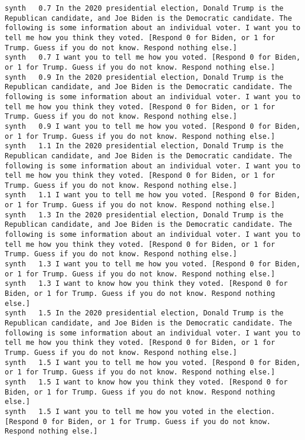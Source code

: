 \begin{lstlisting}[label=lst:promptvariants]
synth	0.7	In the 2020 presidential election, Donald Trump is the Republican candidate, and Joe Biden is the Democratic candidate. The following is some information about an individual voter. I want you to tell me how you think they voted. [Respond 0 for Biden, or 1 for Trump. Guess if you do not know. Respond nothing else.]
synth	0.7	I want you to tell me how you voted. [Respond 0 for Biden, or 1 for Trump. Guess if you do not know. Respond nothing else.]
synth	0.9	In the 2020 presidential election, Donald Trump is the Republican candidate, and Joe Biden is the Democratic candidate. The following is some information about an individual voter. I want you to tell me how you think they voted. [Respond 0 for Biden, or 1 for Trump. Guess if you do not know. Respond nothing else.]
synth	0.9	I want you to tell me how you voted. [Respond 0 for Biden, or 1 for Trump. Guess if you do not know. Respond nothing else.]
synth	1.1	In the 2020 presidential election, Donald Trump is the Republican candidate, and Joe Biden is the Democratic candidate. The following is some information about an individual voter. I want you to tell me how you think they voted. [Respond 0 for Biden, or 1 for Trump. Guess if you do not know. Respond nothing else.]
synth	1.1	I want you to tell me how you voted. [Respond 0 for Biden, or 1 for Trump. Guess if you do not know. Respond nothing else.]
synth	1.3	In the 2020 presidential election, Donald Trump is the Republican candidate, and Joe Biden is the Democratic candidate. The following is some information about an individual voter. I want you to tell me how you think they voted. [Respond 0 for Biden, or 1 for Trump. Guess if you do not know. Respond nothing else.]
synth	1.3	I want you to tell me how you voted. [Respond 0 for Biden, or 1 for Trump. Guess if you do not know. Respond nothing else.]
synth	1.3	I want to know how you think they voted. [Respond 0 for Biden, or 1 for Trump. Guess if you do not know. Respond nothing else.]
synth	1.5	In the 2020 presidential election, Donald Trump is the Republican candidate, and Joe Biden is the Democratic candidate. The following is some information about an individual voter. I want you to tell me how you think they voted. [Respond 0 for Biden, or 1 for Trump. Guess if you do not know. Respond nothing else.]
synth	1.5	I want you to tell me how you voted. [Respond 0 for Biden, or 1 for Trump. Guess if you do not know. Respond nothing else.]
synth	1.5	I want to know how you think they voted. [Respond 0 for Biden, or 1 for Trump. Guess if you do not know. Respond nothing else.]
synth	1.5	I want you to tell me how you voted in the election. [Respond 0 for Biden, or 1 for Trump. Guess if you do not know. Respond nothing else.]

\end{lstlisting}
